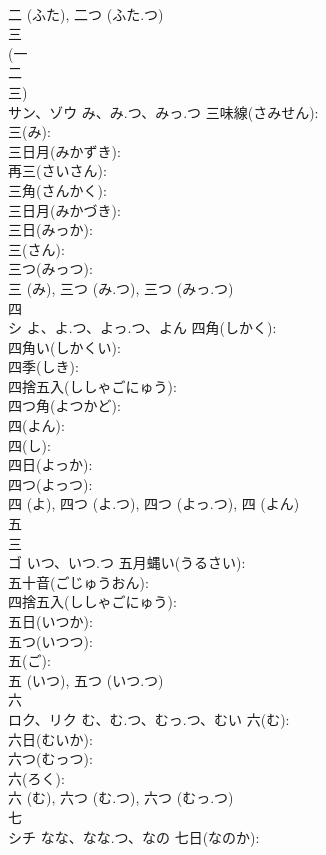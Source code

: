 \documentclass[8pt]{extreport}
\begin{document}
\begin{CJK}{UTF8}{min}
\\	二 (ふた), 二つ (ふた.つ)
\\	三			
\\	(一 
\\	二 
\\	三) 
\\	サン、ゾウ	み、み.つ、みっ.つ	三味線(さみせん): 
\\	三(み): 
\\	三日月(みかずき): 
\\	再三(さいさん): 
\\	三角(さんかく): 
\\	三日月(みかづき): 
\\	三日(みっか): 
\\	三(さん): 
\\	三つ(みっつ): 
\\	三 (み), 三つ (み.つ), 三つ (みっ.つ)
\\	四			
\\	シ	よ、よ.つ、よっ.つ、よん	四角(しかく): 
\\	四角い(しかくい): 
\\	四季(しき): 
\\	四捨五入(ししゃごにゅう): 
\\	四つ角(よつかど): 
\\	四(よん): 
\\	四(し): 
\\	四日(よっか): 
\\	四つ(よっつ): 
\\	四 (よ), 四つ (よ.つ), 四つ (よっ.つ), 四 (よん)
\\	五			
\\	三 
\\	ゴ	いつ、いつ.つ	五月蝿い(うるさい): 
\\	五十音(ごじゅうおん): 
\\	四捨五入(ししゃごにゅう): 
\\	五日(いつか): 
\\	五つ(いつつ): 
\\	五(ご): 
\\	五 (いつ), 五つ (いつ.つ)
\\	六			
\\	ロク、リク	む、む.つ、むっ.つ、むい	六(む): 
\\	六日(むいか): 
\\	六つ(むっつ): 
\\	六(ろく): 
\\	六 (む), 六つ (む.つ), 六つ (むっ.つ)
\\	七			
\\	シチ	なな、なな.つ、なの	七日(なのか): 

\end{CJK}
\end{document}
